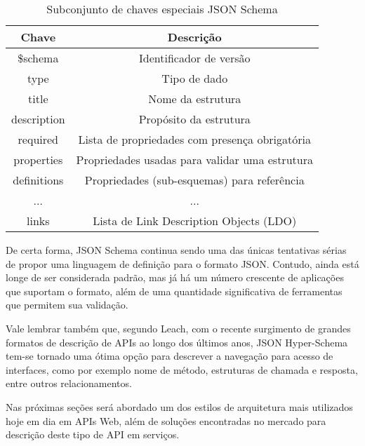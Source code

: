 \begin{table}[ht!]
  \centering
  \begin{tabular}{|c|c|}
    \hline
    Chave & Descrição \\
    \hline
    \$schema & Identificador de versão \\
    \hline
    type & Tipo de dado \\
    \hline
    title & Nome da estrutura \\
    \hline
    description & Propósito da estrutura \\
    \hline
    required & Lista de propriedades com presença obrigatória \\
    \hline
    properties & Propriedades usadas para validar uma estrutura \\
    \hline
    definitions & Propriedades (sub-esquemas) para referência \\
    \hline
    ... & ... \\
    \hline
    links & Lista de Link Description Objects (LDO) \\
    \hline
  \end{tabular}
  \caption{Subconjunto de chaves especiais JSON Schema}
\end{table}

De certa forma, JSON Schema continua sendo uma das únicas tentativas sérias de propor uma linguagem de definição para o formato JSON. Contudo, ainda está longe de ser considerada padrão, mas já há um número crescente de aplicações que suportam o formato, além de uma quantidade significativa de ferramentas que permitem sua validação. \cite{PezoaEtAl2016}

Vale lembrar também que, segundo Leach, com o recente surgimento de grandes formatos de descrição de APIs ao longo dos últimos anos, JSON Hyper-Schema tem-se tornado uma ótima opção para descrever a navegação para acesso de interfaces, como por exemplo nome de método, estruturas de chamada e resposta, entre outros relacionamentos. \cite{Leach2014}

Nas próximas seções será abordado um dos estilos de arquitetura mais utilizados hoje em dia em APIs Web, além de soluções encontradas no mercado para descrição deste tipo de API em serviços.

